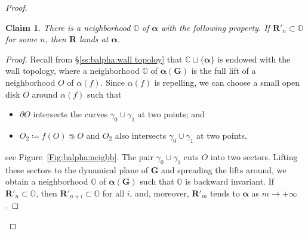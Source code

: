 \documentclass{amsart}
\newcommand{\1}{{\mathbb 1 }}
\newcommand{\bO}{{\mathbb{O}}}
\newcommand{\bR}{{\mathbf R}}
\newcommand{\bG}{{\mathbf G}}
\newtheorem{claim2}{Claim}
\newcommand{\C}{\mathbb{C}}
\theoremstyle{remark}
\numberwithin{equation}{section}
\theoremstyle{definition}
\newcommand{\balpha}{{\boldsymbol \alpha}}
\theoremstyle{nonumberbreak}
\begin{document}
\begin{proof}
\begin{claim2} 
\label{cl2:bO of balpha}There is a neighborhood $\bO$ of $\balpha$ with the following property. If $\bR'_n\subset \bO$ for some $n$, then $\bR$ lands at $\balpha$.
\end{claim2}
\begin{proof}
Recall from \S\ref{ss:balpha:wall topoloy} that $\C\sqcup \{\balpha\}$ is endowed with the wall topology, where a neighborhood $\bO$ of $\balpha(\bG)$ is the full lift of a neighborhood $O$ of $\alpha(f)$. Since $\alpha(f)$ is repelling, we can choose a small open disk $O$ around $\alpha(f)$ such that
\begin{itemize}
\item $\partial O$ intersects the curves $\gamma_0\cup \gamma_1$ at two points; and
\item $O_2\coloneqq f(O)\Supset O$ and $O_2$ also intersects $\gamma_0\cup \gamma_1$ at two points, 
\end{itemize}
 see Figure~\ref{Fig:balpha:neigbb}. The pair $\gamma_0\cup \gamma_1$ cuts $O$ into two sectors. Lifting these sectors to the dynamical plane of $\bG$ and spreading the lifts around, we obtain a neighborhood $\bO$ of $\balpha(\bG)$ such that $\bO$ is backward  invariant. If $\bR'_n\subset \bO$, then $\bR'_{n+i}\subset \bO$ for all $i$, and, moreover, $\bR'_m$ tends to $\balpha$ as $m\to +\infty$.
 \end{proof}


\begin{figure}
\end{figure}
\end{proof}
\end{document}
